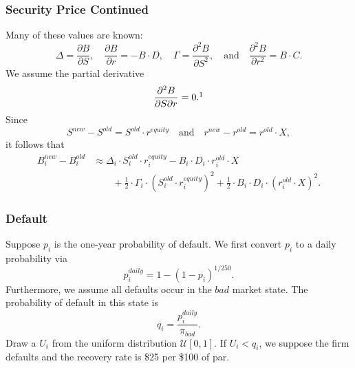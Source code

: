\documentclass{beamer}
\begin{document}
\begin{frame}
\frametitle{Security Price Continued}
Many of these values are known:
$$
\Delta = \frac{\partial B}{\partial S},\quad \frac{\partial B}{\partial r} = -B\cdot D,\quad \Gamma = \frac{\partial^2 B}{\partial S^2},\quad\text{and}\quad \frac{\partial^2 B}{\partial r^2} = B \cdot C.
$$
We assume the partial derivative 
$$
\frac{\partial^2 B}{\partial S\partial r} = 0.\footnotemark
$$
Since 
$$
S^{new} - S^{old} = S^{old}\cdot r^{equity}\quad\text{and}\quad r^{new} - r^{old} = r^{old}\cdot X,
$$
it follows that
\begin{align*}
B_i^{new} - B_i^{old} 	&\approx \Delta_i\cdot S_i^{old}\cdot r_i^{equity}  - B_i\cdot D_i\cdot r_i^{old}\cdot X \\
				&\qquad + \frac{1}{2}\cdot \Gamma_i\cdot  (S_i^{old}\cdot r_i^{equity})^2  + \frac{1}{2}\cdot B_i\cdot D_i\cdot (r_i^{old}\cdot X)^2.
\end{align*}

\end{frame}

\begin{frame}
\frametitle{Default}
Suppose $p_i$ is the one-year probability of default. We first convert $p_i$ to a daily probability via
$$
p_i^{daily} = 1 - (1 - p_i)^{1/250}.
$$
Furthermore, we assume all defaults occur in the $bad$ market state. The probability of default in this state is
$$
q_i = \frac{p_i^{daily}}{\pi_{bad}}.
$$
Draw a $U_i$ from the uniform distribution $\mathcal{U}[0, 1]$. If $U_i < q_i$, we suppose the firm defaults and the recovery rate is \$25 per \$100 of par.
\end{frame}
\end{document}

